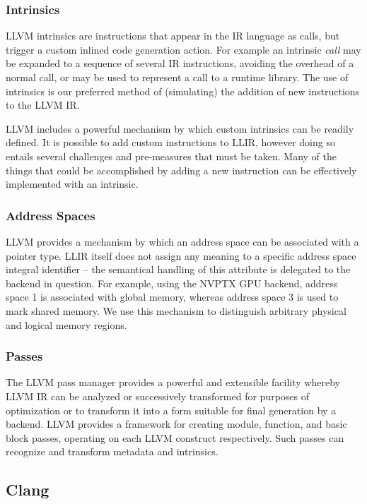 \documentclass[12pt]{article}
\begin{document}
\subsubsection{Intrinsics}

LLVM intrinsics are instructions that appear in the IR language as calls, but trigger a custom inlined code generation action. For example an intrinsic {\it call} may be expanded to a sequence of several IR instructions, avoiding the overhead of a normal call, or may be used to represent a call to a runtime library. The use of intrinsics is our preferred method of (simulating) the addition of new instructions to the LLVM IR.

LLVM includes a powerful mechanism by which custom intrinsics can be readily defined. It is possible to add custom instructions to LLIR, however doing so entails several challenges and pre-measures that must be taken. Many of the things that could be accomplished by adding a new instruction can be effectively implemented with an intrinsic.

\subsubsection{Address Spaces}

LLVM provides a mechanism by which an address space can be associated with a pointer type. LLIR itself does not assign any meaning to a specific address space integral identifier -- the semantical handling of this attribute is delegated to the backend in question. For example, using the NVPTX GPU backend, address space 1 is associated with global memory, whereas address space 3 is used to mark shared memory. We use this mechanism to distinguish arbitrary physical and logical memory regions.

\subsubsection{Passes}

The LLVM pass manager provides a powerful and extensible facility whereby LLVM IR can be analyzed or successively transformed for purposes of optimization or to transform it into a form suitable for final generation by a backend. LLVM provides a framework for creating module, function, and basic block passes, operating on each LLVM construct respectively. Such passes can recognize and transform metadata and intrinsics.

\subsection{Clang}
\end{document}
